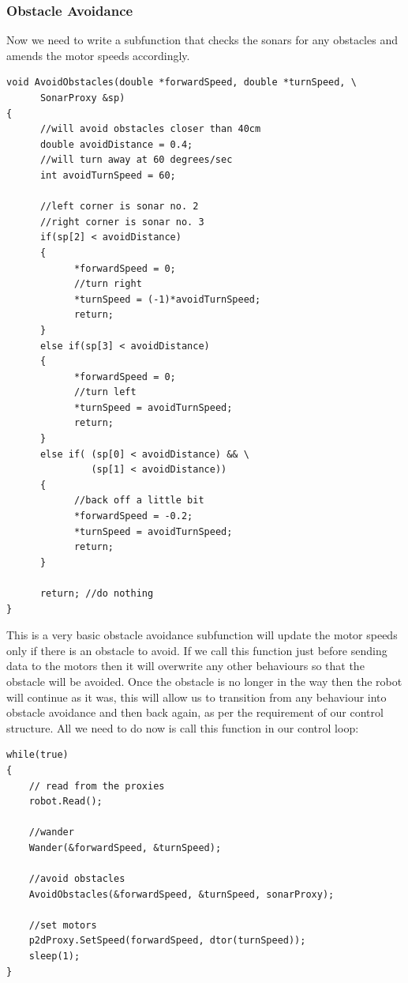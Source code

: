\documentclass[a4paper]{report}
\begin{document}
\subsubsection{Obstacle Avoidance}
Now we need to write a subfunction that checks the sonars for any obstacles and amends the motor speeds accordingly.
\begin{verbatim}
void AvoidObstacles(double *forwardSpeed, double *turnSpeed, \
      SonarProxy &sp)
{
      //will avoid obstacles closer than 40cm
      double avoidDistance = 0.4;
      //will turn away at 60 degrees/sec
      int avoidTurnSpeed = 60;
      
      //left corner is sonar no. 2
      //right corner is sonar no. 3
      if(sp[2] < avoidDistance)
      {
            *forwardSpeed = 0;
            //turn right
            *turnSpeed = (-1)*avoidTurnSpeed;
            return;
      }
      else if(sp[3] < avoidDistance)
      {
            *forwardSpeed = 0;
            //turn left
            *turnSpeed = avoidTurnSpeed;
            return;
      }
      else if( (sp[0] < avoidDistance) && \
               (sp[1] < avoidDistance))
      {
            //back off a little bit
            *forwardSpeed = -0.2;
            *turnSpeed = avoidTurnSpeed;  
            return;
      }
      
      return; //do nothing
}
\end{verbatim}
This is a very basic obstacle avoidance subfunction will update the motor speeds only if there is an obstacle to avoid. If we call this function just before sending data to the motors then it will overwrite any other behaviours so that the obstacle will be avoided. Once the obstacle is no longer in the way then the robot will continue as it was, this will allow us to transition from any behaviour into obstacle avoidance and then back again, as per the requirement of our control structure. All we need to do now is call this function in our control loop:
\begin{verbatim}
while(true)
{		
    // read from the proxies
    robot.Read();
		
    //wander
    Wander(&forwardSpeed, &turnSpeed);
		
    //avoid obstacles
    AvoidObstacles(&forwardSpeed, &turnSpeed, sonarProxy);
		
    //set motors
    p2dProxy.SetSpeed(forwardSpeed, dtor(turnSpeed));
    sleep(1);
}
\end{verbatim}
\end{document}
